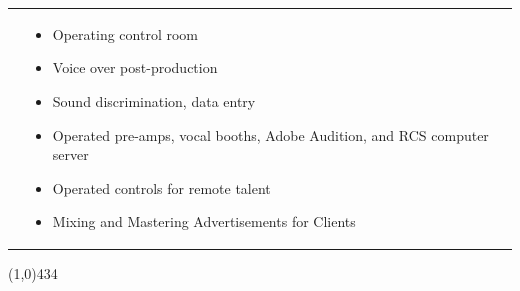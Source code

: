 \documentclass{res}
\newcommand{\frstCVcell}{2.5cm}
\begin{document}
\begin{resume}
\begin{tabularx}{\textwidth}{p{\frstCVcell}Xc}
    &
    \begin{itemize}
    \item Operating control room
    \item Voice over post-production
    \item Sound discrimination, data entry
    \item Operated pre-amps, vocal booths, Adobe Audition, and RCS computer server
    \item Operated controls for remote talent
    \item Mixing and Mastering Advertisements for Clients
    \end{itemize}
    & \\
  \end{tabularx}
  \newline
  \line(1,0){434}

  \pagebreak

\end{resume}
\end{document}
